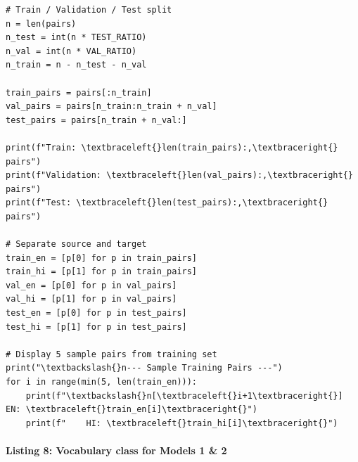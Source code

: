 \documentclass[12pt,a4paper,oneside]{report}
\begin{document}
\begin{Verbatim}[commandchars=\\\{\},breaklines=true,breakanywhere=true,fontsize=\scriptsize,frame=leftline,framesep=2mm,rulecolor=\color{gray}]
# Train / Validation / Test split
n = len(pairs)
n_test = int(n * TEST_RATIO)
n_val = int(n * VAL_RATIO)
n_train = n - n_test - n_val

train_pairs = pairs[:n_train]
val_pairs = pairs[n_train:n_train + n_val]
test_pairs = pairs[n_train + n_val:]

print(f"Train: \textbraceleft{}len(train_pairs):,\textbraceright{} pairs")
print(f"Validation: \textbraceleft{}len(val_pairs):,\textbraceright{} pairs")
print(f"Test: \textbraceleft{}len(test_pairs):,\textbraceright{} pairs")

# Separate source and target
train_en = [p[0] for p in train_pairs]
train_hi = [p[1] for p in train_pairs]
val_en = [p[0] for p in val_pairs]
val_hi = [p[1] for p in val_pairs]
test_en = [p[0] for p in test_pairs]
test_hi = [p[1] for p in test_pairs]

# Display 5 sample pairs from training set
print("\textbackslash{}n--- Sample Training Pairs ---")
for i in range(min(5, len(train_en))):
    print(f"\textbackslash{}n[\textbraceleft{}i+1\textbraceright{}] EN: \textbraceleft{}train_en[i]\textbraceright{}")
    print(f"    HI: \textbraceleft{}train_hi[i]\textbraceright{}")
\end{Verbatim}
\paragraph{Listing 8: Vocabulary class for Models 1 \& 2}\mbox{}\\[-1ex]
\end{document}
